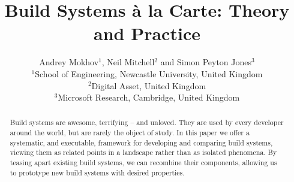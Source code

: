 \documentclass{jfp1}
\begin{document}
\title[Build Systems \`a la Carte: Theory and Practice]
{Build Systems \`a la Carte: Theory and Practice}

\author[Andrey Mokhov, Neil Mitchell and Simon Peyton Jones]
{Andrey Mokhov$^1$, Neil Mitchell$^2$ and Simon Peyton Jones$^3$\\
$^1$School of Engineering, Newcastle University, United Kingdom\\
$^2$Digital Asset, United Kingdom\\
$^3$Microsoft Research, Cambridge, United Kingdom}




\maketitle

\begin{abstract}
Build systems are awesome, terrifying -- and unloved. They are used by every
developer around the world, but are rarely the object of study. In this paper we
offer a systematic, and executable, framework for developing and comparing build
systems, viewing them as related points in a landscape rather than as isolated
phenomena. By teasing apart existing build systems, we can recombine their
components, allowing us to prototype new build systems with desired properties.
\end{abstract}














\appendix
% 
\end{document}
